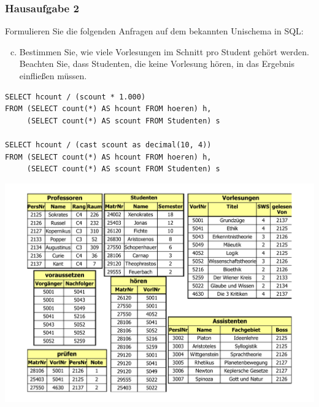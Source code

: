 \begin{frame}[fragile]
	\frametitle{Hausaufgabe 2}
	\vspace{0.25cm}

	\begin{multicols}{2}
		Formulieren Sie die folgenden Anfragen auf dem bekannten Unischema in SQL:
		\begin{enumerate}[a)]
			\setcounter{enumi}{2}
			\item Bestimmen Sie, wie viele Vorlesungen im Schnitt pro Student gehört werden. 
				  Beachten Sie, dass Studenten, die keine Vorlesung hören, in das Ergebnis einfließen müssen.
		\end{enumerate}
		\begin{verbatim}
SELECT hcount / (scount * 1.000)
FROM (SELECT count(*) AS hcount FROM hoeren) h,
     (SELECT count(*) AS scount FROM Studenten) s

SELECT hcount / (cast scount as decimal(10, 4))
FROM (SELECT count(*) AS hcount FROM hoeren) h,
     (SELECT count(*) AS scount FROM Studenten) s
		\end{verbatim}
		\vfill\columnbreak

		\begin{center}
			\includegraphics[height=.6\paperheight]{../img/uni.pdf}
		\end{center}
	\end{multicols}
\end{frame}

